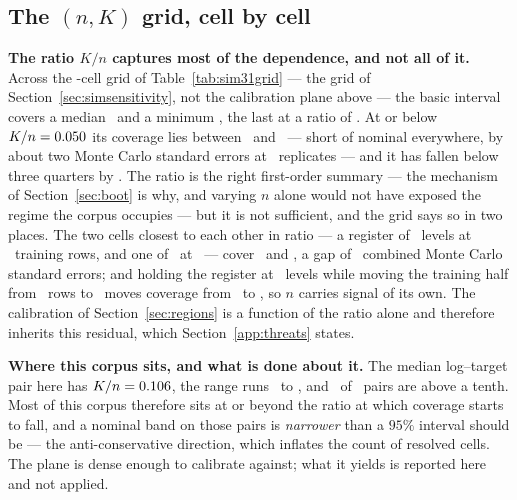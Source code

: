 \subsection{The $(n,K)$ grid, cell by cell}


\textbf{The ratio $K/n$ captures most of the dependence, and not all of it.}
Across the \nSimGridCells-cell grid of Table~\ref{tab:sim31grid} --- the
grid of Section~\ref{sec:simsensitivity}, not the calibration plane above ---
the basic interval covers a median \coverageGridMedian\ and a
minimum \coverageGridMin, the last at a ratio of \simGridWorstRatio. At or
below $K/n = 0.050$ its coverage lies between \coverageGridSafeMin\ and
\coverageGridSafeMax\ --- short of nominal everywhere, by about two Monte
Carlo standard errors at \nPlaneGridReps\ replicates --- and it has fallen
below three quarters by \simGridRatioBad. The ratio is the right first-order
summary --- the mechanism of Section~\ref{sec:boot} is why, and
varying $n$ alone would not have exposed the regime the corpus occupies ---
but it is not sufficient, and the grid says so in two places. The two cells
closest to each other in ratio --- a register of \simGridSameRatioKa\ levels
at \simGridSameRatioNa\ training rows, and one of \simGridSameRatioKb\ at
\simGridSameRatioNb\ --- cover \simGridSameRatioCovA\ and
\simGridSameRatioCovB, a gap of \simGridSameRatioGapSE\ combined Monte Carlo
standard errors; and holding the register at \simGridFixedK\ levels while
moving the training half from \simGridFixedNa\ rows to \simGridFixedNb\ moves
coverage from \simGridFixedCovA\ to \simGridFixedCovB, so $n$ carries signal
of its own. The calibration of Section~\ref{sec:regions} is a function of the ratio
alone and therefore inherits this residual, which
Section~\ref{app:threats} states.

\textbf{Where this corpus sits, and what is done about it.} The median
log--target pair here has $K/n = 0.106$, the range runs
\corpusRatioMin\ to \corpusRatioMax, and \nPairsRatioAboveTenth\ of \nPairs\
pairs are above a tenth. Most of this corpus therefore sits at or beyond the
ratio at which coverage starts to fall, and a nominal band on those pairs is
\emph{narrower} than a $95\%$ interval should be --- the anti-conservative
direction, which inflates the count of resolved cells. The plane is dense
enough to calibrate against; what it yields is reported here and not
applied.

